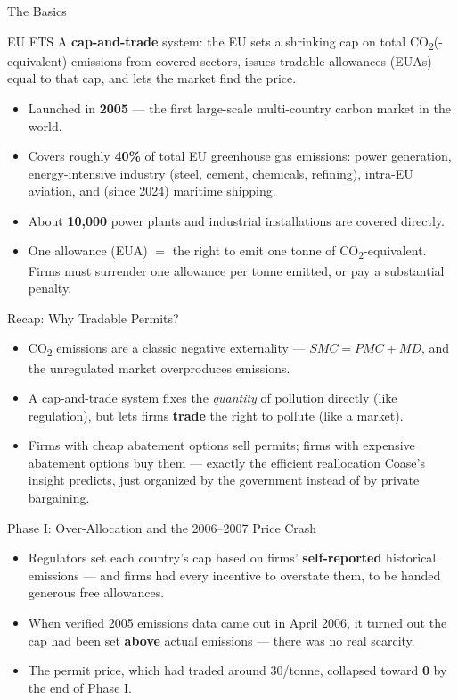 \documentclass[11pt,aspectratio=169]{beamer}
\begin{document}
\begin{frame}{The Basics}
	\begin{block}{EU ETS}
		A \textbf{cap-and-trade} system: the EU sets a shrinking cap on total CO\textsubscript{2}(-equivalent) emissions from covered sectors, issues tradable allowances (EUAs) equal to that cap, and lets the market find the price.
	\end{block}
	\begin{itemize}
		\item Launched in \textbf{2005} --- the first large-scale multi-country carbon market in the world.
		\item Covers roughly \textbf{40\%} of total EU greenhouse gas emissions: power generation, energy-intensive industry (steel, cement, chemicals, refining), intra-EU aviation, and (since 2024) maritime shipping.
		\item About \textbf{10,000} power plants and industrial installations are covered directly.
		\item One allowance (EUA) $=$ the right to emit one tonne of CO\textsubscript{2}-equivalent. Firms must surrender one allowance per tonne emitted, or pay a substantial penalty.
	\end{itemize}
\end{frame}

\begin{frame}{Recap: Why Tradable Permits?}

	\begin{itemize}
		\item CO\textsubscript{2} emissions are a classic negative externality --- $SMC = PMC + MD$, and the unregulated market overproduces emissions.
		\item A cap-and-trade system fixes the \emph{quantity} of pollution directly (like regulation), but lets firms \textbf{trade} the right to pollute (like a market).
		\item Firms with cheap abatement options sell permits; firms with expensive abatement options buy them --- exactly the efficient reallocation Coase's insight predicts, just organized by the government instead of by private bargaining.
	\end{itemize}
\end{frame}



\begin{frame}{Phase I: Over-Allocation and the 2006--2007 Price Crash}
	\begin{itemize}
		\item Regulators set each country's cap based on firms' \textbf{self-reported} historical emissions --- and firms had every incentive to overstate them, to be handed generous free allowances.
		\item When verified 2005 emissions data came out in April 2006, it turned out the cap had been set \textbf{above} actual emissions --- there was no real scarcity.
		\item The permit price, which had traded around \texteuro{}30/tonne, collapsed toward \textbf{\texteuro{}0} by the end of Phase I.
	\end{itemize}

\end{frame}
\end{document}
